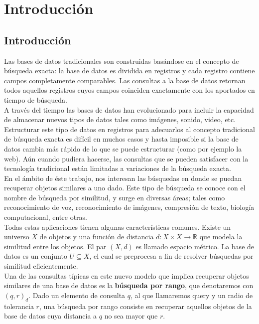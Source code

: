 \chapter{Introducci\'on}

\section{Introducci\'on}
Las bases de datos tradicionales son construidas bas\'andose en el concepto de b\'usqueda exacta: la base de datos es dividida en registros y cada registro contiene campos completamente comparables. Las consultas a la base de datos retornan todos aquellos registros cuyos campos coinciden exactamente con los aportados en tiempo de b\'usqueda.\\
				
A trav\'es del tiempo las bases de datos han evolucionado para incluir la capacidad de almacenar nuevos tipos de datos tales como im\'agenes, sonido, video, etc. Estructurar este tipo de datos en registros para adecuarlos al concepto tradicional de b\'usqueda exacta es dif\'icil en muchos casos y hasta imposible si la base de datos cambia m\'as r\'apido de lo que se puede estructurar (como por ejemplo la web). A\'un cuando pudiera hacerse, las consultas que se pueden satisfacer con la tecnolog\'ia tradicional est\'an limitadas a variaciones de la b\'usqueda exacta.\\
					
En el \'ambito de \'este trabajo, nos interesan las b\'usquedas en donde se puedan recuperar objetos similares a uno dado. Este tipo de b\'usqueda se conoce con el nombre de b\'usqueda por similitud, y surge en diversas \'areas; tales como reconocimiento de voz, reconocimiento de im\'agenes, compresi\'on de texto, biolog\'ia computacional, entre otras.\\
					
Todas estas aplicaciones tienen algunas caracter\'isticas comunes. Existe un universo $X$ de objetos y una funci\'on de distancia $d: X \times X \rightarrow \mathbb{R}$ que modela la similitud entre los objetos. El par $(X, d)$ es llamado espacio m\'etrico. La base de datos es un conjunto $U \subseteq X$, el cual se preprocesa a fin de resolver b\'usquedas por similitud eficientemente.\\
					
Una de las consultas t\'ipicas en este nuevo modelo que implica recuperar objetos similares de una base de datos es la \textbf{b\'usqueda por rango}, que denotaremos con $(q, r)_d$. Dado un elemento de consulta $q$, al que llamaremos query y un radio de tolerancia $r$, una b\'usqueda por rango consiste en recuperar aquellos objetos de la base de datos cuya distancia a $q$ no sea mayor que $r$.\\

